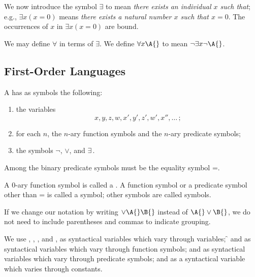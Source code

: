 We now introduce the symbol $\exists$ to mean \emph{there exists an individual $x$ such that};
e.g., $\exists x(x = 0)$ means \emph{there exists a natural number $x$ such that $x = 0$}.
The occurrences of $x$ in $\exists x (x = 0)$ are bound.

We may define $\forall$ in terms of $\exists$.
We define $\forall x \A{}$ to mean $\neg \exists x \neg \A{}$.


\subsection{First-Order Languages}
\begin{shaded*}

    A  has as symbols the following:
    \begin{enumerate}
        \item the variables
            \begin{equation}
                x,y,z,w,x',y',z',w',x'',\dots\,;
            \end{equation}
        \item for each $n$, the $n$-ary function symbols and the $n$-ary predicate symbols;
        \item the symbols $\neg$, $\vee$, and $\exists$\,.
    \end{enumerate}
\end{shaded*}

\begin{remark}
    Among the binary predicate symbols must be the equality symbol =.
\end{remark}

A 0-ary function symbol is called a .
A function symbol or a predicate symbol other than = is called a  symbol;
other symbols are called  symbols.


If we change our notation by writing $\vee \A{}\B{}$ instead of $\A{} \vee \B{}$, we do not need to include parentheses and commas to indicate grouping.

We use \x{}, \y{}, \z{}, and \w{}, as syntactical variables which vary through variables;
\f{} and \g{} as syntactical variables which vary through function symbols;
\p{} and \q{} as syntactical variables which vary through predicate symbols;
and \e{} as a syntactical variable which varies through constants.

